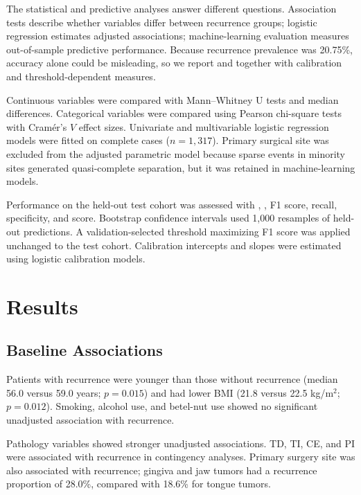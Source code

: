 \documentclass[11pt,a4paper]{article}
\newcommand{\ROC}{\text{ROC-AUC}}
\newcommand{\AUPRC}{\text{AUPRC}}
\newcommand{\Brier}{\text{Brier}}
\begin{document}
The statistical and predictive analyses answer different questions. Association tests describe whether variables differ between recurrence groups; logistic regression estimates adjusted associations; machine-learning evaluation measures out-of-sample predictive performance. Because recurrence prevalence was 20.75\%, accuracy alone could be misleading, so we report \ROC{} and \AUPRC{} together with calibration and threshold-dependent measures.

Continuous variables were compared with Mann--Whitney U tests and median differences. Categorical variables were compared using Pearson chi-square tests with Cram\'er's $V$ effect sizes. Univariate and multivariable logistic regression models were fitted on complete cases ($n=1,317$). Primary surgical site was excluded from the adjusted parametric model because sparse events in minority sites generated quasi-complete separation, but it was retained in machine-learning models.

Performance on the held-out test cohort was assessed with \ROC{}, \AUPRC{}, F1 score, recall, specificity, and \Brier{} score. Bootstrap confidence intervals used 1,000 resamples of held-out predictions. A validation-selected threshold maximizing F1 score was applied unchanged to the test cohort. Calibration intercepts and slopes were estimated using logistic calibration models.

\section{Results}

\subsection{Baseline Associations}

Patients with recurrence were younger than those without recurrence (median 56.0 versus 59.0 years; $p=0.015$) and had lower BMI (21.8 versus 22.5 kg/m$^2$; $p=0.012$). Smoking, alcohol use, and betel-nut use showed no significant unadjusted association with recurrence.

Pathology variables showed stronger unadjusted associations. TD, TI, CE, and PI were associated with recurrence in contingency analyses. Primary surgery site was also associated with recurrence; gingiva and jaw tumors had a recurrence proportion of 28.0\%, compared with 18.6\% for tongue tumors.
\end{document}
